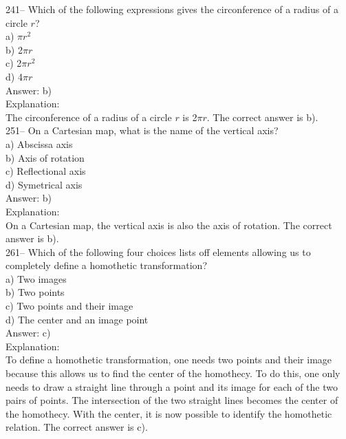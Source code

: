 \documentclass[letterpaper, 12pt]{article}
\begin{document}
241-- Which of the following expressions gives the circonference of a radius of a circle $r$?\\

a) $\pi r^{2}$ \\
b) 2$\pi r$ \\
c) 2$\pi r^{2}$ \\
d) 4$\pi r$ \\

Answer: b)\\

Explanation:\\
The circonference of a radius of a circle $r$ is 2$\pi r$.  The correct answer is b).\\


251-- On a Cartesian map, what is the name of the vertical axis?\\

a) Abscissa axis\\
b) Axis of rotation\\
c) Reflectional axis\\
d) Symetrical axis\\

Answer: b)\\

Explanation:\\
On a Cartesian map, the vertical axis is also the axis of rotation. The correct answer is b).\\



261-- Which of the following four choices lists off elements allowing us to completely define a homothetic transformation?\\

a) Two images\\
b) Two points\\
c) Two points and their image\\
d) The center and an image point\\

Answer: c)\\

Explanation: \\
To define a homothetic transformation, one needs two points and their image because this allows us to find the center of the homothecy. To do this, one only needs to draw a straight line through a point and its image for each of the two pairs of points. The intersection of the two straight lines becomes the center of the homothecy. With the center, it is now possible to identify the homothetic relation. The correct answer is c).\\
\end{document}

